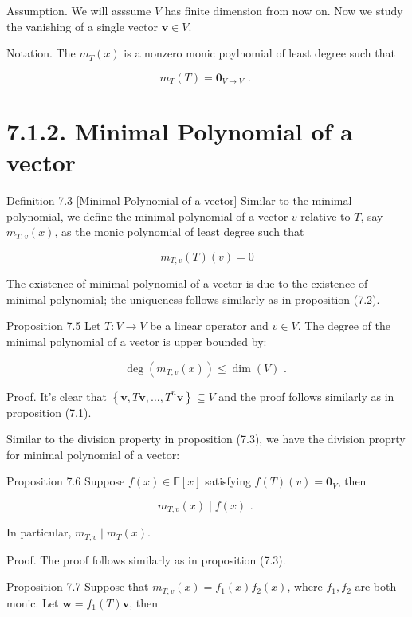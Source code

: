 \documentclass[11pt]{article}
\begin{document}
Assumption. We will asssume \(V\) has finite dimension from now on. Now we study the vanishing of a single vector \(\mathbf{v} \in  V\).

Notation. The \({m}_{T}\left( x\right)\) is a nonzero monic poylnomial of least degree such that

\[
{m}_{T}\left( T\right)  = {\mathbf{0}}_{V \rightarrow  V}\text{ . }
\]

\section*{7.1.2. Minimal Polynomial of a vector}

Definition 7.3 [Minimal Polynomial of a vector] Similar to the minimal polynomial, we define the minimal polynomial of a vector \(v\) relative to \(T\), say \({m}_{T,v}\left( x\right)\), as the monic polynomial of least degree such that

\[
{m}_{T,v}\left( T\right) \left( v\right)  = 0
\]

The existence of minimal polynomial of a vector is due to the existence of minimal polynomial; the uniqueness follows similarly as in proposition (7.2).

Proposition 7.5 Let \(T : V \rightarrow  V\) be a linear operator and \(v \in  V\). The degree of the minimal polynomial of a vector is upper bounded by:

\[
\deg \left( {{m}_{T,v}\left( x\right) }\right)  \leq  \dim \left( V\right) \text{ . }
\]

Proof. It’s clear that \(\left\{  {\mathbf{v},T\mathbf{v},\ldots ,{T}^n\mathbf{v}}\right\}   \subseteq  V\) and the proof follows similarly as in proposition (7.1).

Similar to the division property in proposition (7.3), we have the division proprty for minimal polynomial of a vector:

Proposition 7.6 Suppose \(f\left( x\right)  \in  \mathbb{F}\left\lbrack  x\right\rbrack\) satisfying \(f\left( T\right) \left( v\right)  = {\mathbf{0}}_{V}\), then

\[
{m}_{T,v}\left( x\right)  \mid  f\left( x\right) \text{ . }
\]

In particular, \({m}_{T,v} \mid  {m}_{T}\left( x\right)\).

Proof. The proof follows similarly as in proposition (7.3).

Proposition 7.7 Suppose that \({m}_{T,v}\left( x\right)  = {f}_1\left( x\right) {f}_2\left( x\right)\), where \({f}_1,{f}_2\) are both monic. Let \(\mathbf{w} = {f}_1\left( T\right) \mathbf{v}\), then
\end{document}

